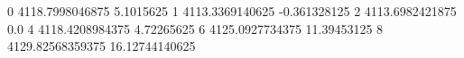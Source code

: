 0 4118.7998046875 5.1015625
1 4113.3369140625 -0.361328125
2 4113.6982421875 0.0
4 4118.4208984375 4.72265625
6 4125.0927734375 11.39453125
8 4129.82568359375 16.12744140625
